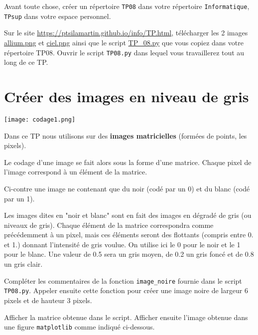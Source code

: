 Avant toute chose, créer un répertoire \lstinline{TP08} dans votre répertoire \lstinline{Informatique}, \lstinline{TPsup} dans votre espace personnel.

Sur le site \url{https://ptsilamartin.github.io/info/TP.html}, télécharger les 2  images \href{https://ptsilamartin.github.io/info/TP/allium.png}{allium.png}
et \href{https://ptsilamartin.github.io/info/TP/ciel.png}{ciel.png} ainsi que le script \href{https://ptsilamartin.github.io/info/TP/TP_08.py}{TP\_08.py}  que vous copiez dans votre répertoire TP08. Ouvrir le script \lstinline{TP08.py} dans lequel vous travaillerez tout au long de ce TP.

\section*{Créer des images en niveau de gris}



\begin{marginfigure}
\texttt{[image: codage1.png]}
\end{marginfigure}
Dans ce TP nous utilisons sur des \textbf{images matricielles} (formées de points, les pixels). 

Le codage d'une image se fait alors sous la forme d'une matrice. Chaque pixel de l'image correspond à un élément de la matrice.

Ci-contre une image ne contenant que du noir (codé par un 0) et du blanc (codé par un 1).


Les images dites en "noir et blanc" sont en fait des images en dégradé de gris (ou niveaux de gris). Chaque élément de la matrice correspondra comme précédemment à un pixel, mais ces éléments seront des flottants (compris entre 0. et 1.) donnant l'intensité de gris voulue. On utilise ici le 0 pour le noir et le 1 pour le blanc. Une valeur de 0.5 sera un gris moyen, de 0.2 un gris foncé et de 0.8 un gris clair.

\begin{question}
Compléter les commentaires de la fonction \lstinline{image_noire} fournie dans le script \lstinline{TP08.py}. Appeler ensuite cette fonction pour créer une image noire de largeur 6 pixels et de hauteur 3 pixels.
\end{question}

\begin{question}
Afficher la matrice obtenue dans le script. Afficher ensuite  l'image obtenue dans une figure \lstinline{matplotlib} comme indiqué ci-dessous.
\end{question}

